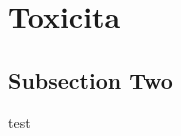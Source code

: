 \documentclass[twoside,twocolumn]{article}
\begin{document}

\section{Toxicita}

\subsection{}



\subsection{Subsection Two}
test\\




\end{document}
